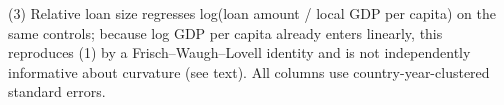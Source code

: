 \begin{table}[htbp]
\centering
\caption{Loan-Level Robustness: lm6 Under Four Specifications}
\label{tab:table12}
\par\smallskip\footnotesize (3) Relative loan size regresses log(loan amount / local GDP per capita) on the same controls; because log GDP per capita already enters linearly, this reproduces (1) by a Frisch--Waugh--Lovell identity and is not independently informative about curvature (see text). All columns use country-year-clustered standard errors.
\end{table}